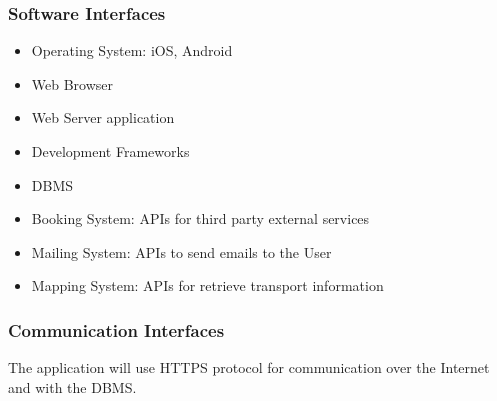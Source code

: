 \subsubsection{Software Interfaces}
\begin{itemize}
	\item Operating System: iOS, Android
	\item Web Browser
	\item Web Server application
	\item Development Frameworks
	\item DBMS
	\item Booking System: APIs for third party external services
	\item Mailing System: APIs to send emails to the User
	\item Mapping System: APIs for retrieve transport information
\end{itemize}

\subsubsection{Communication Interfaces}
The application will use HTTPS protocol for communication over the Internet and with the DBMS.

